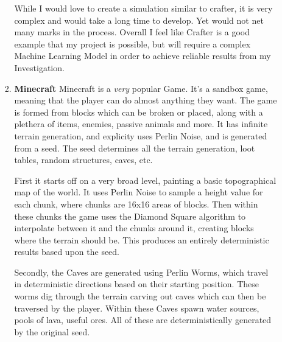 \begin{flushleft}
\begin{enumerate}
\begin{enumerate}
\begin{enumerate}
                            While I would love to create a simulation similar to crafter, it is very complex and would take a long time to develop. Yet
                            would not net many marks in the process. Overall I feel like Crafter is a good example that my project is possible, but will
                            require a complex Machine Learning Model in order to achieve reliable results from my Investigation.

                            \vspace{0.2cm}
                        \item {\large \textbf{Minecraft}}
                            Minecraft is a \textit{very} popular Game. It's a sandbox game, meaning that the player can do almost anything they want.
                            The game is formed from blocks which can be broken or placed, along with a plethera of items, enemies, passive animals
                            and more. It has infinite terrain generation, and explicity uses Perlin Noise, and is generated from a seed. The seed determines
                            all the terrain generation, loot tables, random structures, caves, etc. \\
                            
                            \vspace{0.2cm}

                            First it starts off on a very broad level, painting a basic topographical map of the world. It uses Perlin Noise to sample
                            a height value for each chunk, where chunks are 16x16 areas of blocks. Then within these chunks the game uses the Diamond Square
                            algorithm to interpolate between it and the chunks around it, creating blocks where the terrain should be. This produces an 
                            entirely deterministic results based upon the seed.\\

                            \vspace{0.2cm}

                            Secondly, the Caves are generated using Perlin Worms, which travel in deterministic directions based on their starting position.
                            These worms dig through the terrain carving out caves which can then be traversed by the player. Within these Caves spawn water
                            sources, pools of lava, useful ores. All of these are deterministically generated by the original seed.


\end{enumerate}
\end{enumerate}
\end{enumerate}
\end{flushleft}
